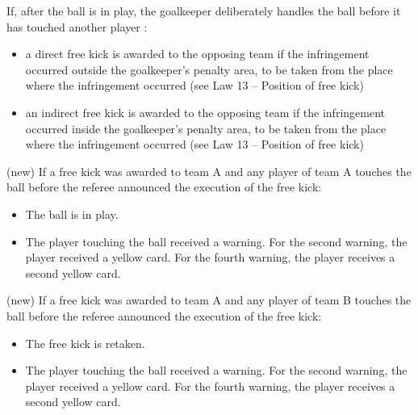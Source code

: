 {\bigskip

 If, after the ball is in play, the goalkeeper deliberately handles the ball before it has touched another player :

\begin{itemize}
\item a direct free kick is awarded to the opposing team if the infringement occurred outside the goalkeeper's penalty area, to be taken from the place where the infringement occurred (see Law 13 -- Position of free kick)
\item an indirect free kick is awarded to the opposing team if the infringement occurred inside the goalkeeper's penalty area, to be taken from the place where the infringement occurred (see Law 13 -- Position of free kick)
\end{itemize}}

\bigskip

(new) If a free kick was awarded to team A and any player of team A touches the ball before the referee announced the execution of the free kick:

\begin{itemize}
\item The ball is in play.
\item The player touching the ball received a warning. For the second warning, the player received a yellow card. For the fourth warning, the player receives a second yellow card.
\end{itemize}

\bigskip

(new) If a free kick was awarded to team A and any player of team B touches the ball before the referee announced the execution of the free kick:

\begin{itemize}
\item The free kick is retaken.
\item The player touching the ball received a warning. For the second warning, the player received a yellow card. For the fourth warning, the player receives a second yellow card.
\end{itemize}